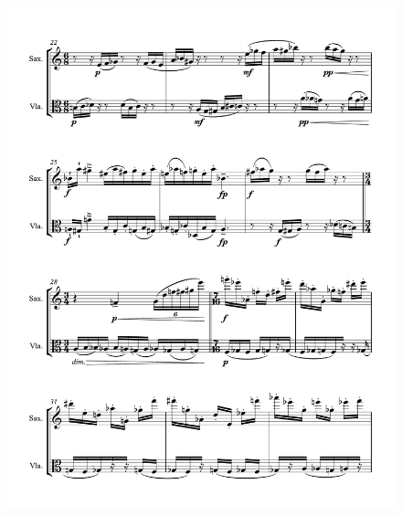 \begin{figure}[htbp]
    \centering
	\includegraphics[width=6.5in]{figures/Sax_Viola_3.pdf}
\end{figure}

